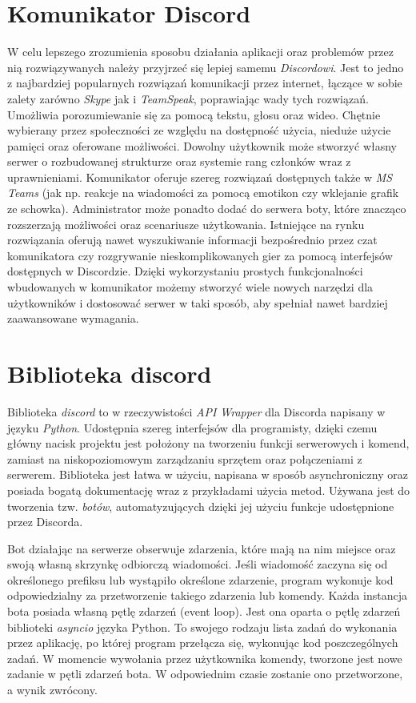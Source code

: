 \documentclass[shortabstract,inz]{iithesis}
\begin{document}
		\section{Komunikator Discord}
			W celu lepszego zrozumienia sposobu działania aplikacji oraz problemów przez nią rozwiązywanych należy przyjrzeć się lepiej samemu \textit{Discordowi}\cite{discord}. Jest to jedno z najbardziej popularnych rozwiązań komunikacji przez internet, łączące w sobie zalety zarówno \textit{Skype}\cite{skype} jak i \textit{TeamSpeak}\cite{teamspeak}, poprawiając wady tych rozwiązań. Umożliwia porozumiewanie się za pomocą tekstu, głosu oraz wideo. Chętnie wybierany przez społeczności ze względu na dostępność użycia, nieduże użycie pamięci oraz oferowane możliwości. Dowolny użytkownik może stworzyć własny serwer o rozbudowanej strukturze oraz systemie rang członków wraz z uprawnieniami. Komunikator oferuje szereg rozwiązań dostępnych także w \textit{MS Teams}\cite{msteams} (jak np. reakcje na wiadomości za pomocą emotikon czy wklejanie grafik ze schowka). Administrator może ponadto dodać do serwera boty, które znacząco rozszerzają możliwości oraz scenariusze użytkowania. Istniejące na rynku rozwiązania oferują nawet wyszukiwanie informacji bezpośrednio przez czat komunikatora czy rozgrywanie nieskomplikowanych gier za pomocą interfejsów dostępnych w Discordzie. Dzięki wykorzystaniu prostych funkcjonalności wbudowanych w komunikator możemy stworzyć wiele nowych narzędzi dla użytkowników i dostosować serwer w taki sposób, aby spełniał nawet bardziej zaawansowane wymagania.
		
		\section{Biblioteka discord}
			Biblioteka \textit{discord} to w rzeczywistości \textit{API Wrapper} dla Discorda napisany w języku \textit{Python}. Udostępnia szereg interfejsów dla programisty, dzięki czemu główny nacisk projektu jest położony na tworzeniu funkcji serwerowych i komend, zamiast na niskopoziomowym zarządzaniu sprzętem oraz połączeniami z serwerem. Biblioteka jest łatwa w użyciu, napisana w sposób asynchroniczny oraz posiada bogatą dokumentację\cite{discordpydocs} wraz z przykładami użycia metod\cite{discordpyexamples}. Używana jest do tworzenia tzw. \textit{botów}\cite{wikibot}, automatyzujących dzięki jej użyciu funkcje udostępnione przez Discorda. 

			Bot działając na serwerze obserwuje zdarzenia, które mają na nim miejsce oraz swoją własną skrzynkę odbiorczą wiadomości. Jeśli wiadomość zaczyna się od określonego prefiksu lub wystąpiło określone zdarzenie, program wykonuje kod odpowiedzialny za przetworzenie takiego zdarzenia lub komendy. 
			Każda instancja bota posiada własną pętlę zdarzeń (event loop). Jest ona oparta o pętlę zdarzeń biblioteki \textit{asyncio}\cite{asyncio} języka Python. To swojego rodzaju lista zadań do wykonania przez aplikację, po której program przełącza się, wykonując kod poszczególnych zadań. W momencie wywołania przez użytkownika komendy, tworzone jest nowe zadanie w pętli zdarzeń bota. W odpowiednim czasie zostanie ono przetworzone, a wynik zwrócony.
			
\end{document}

